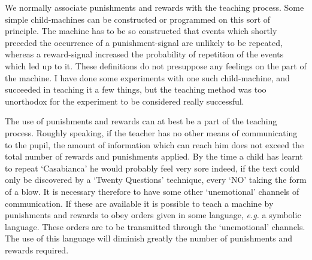     We normally associate punishments and rewards with the teaching process. Some simple child-machines can be constructed or programmed on this sort of principle. The machine has to be so constructed that events which shortly preceded the occurrence of a punishment-signal are unlikely to be repeated, whereas a reward-signal increased the probability of repetition of the events which led up to it. These definitions do not presuppose any feelings on the part of the machine. I have done some experiments with one such child-machine, and succeeded in teaching it a few things, but the teaching method was too unorthodox for the experiment to be considered really successful.

    The use of punishments and rewards can at best be a part of the teaching process. Roughly speaking, if the teacher has no other means of communicating to the pupil, the amount of information which can reach him does not exceed the total number of rewards and punishments applied. By the time a child has learnt to repeat ‘Casabianca' he would probably feel very sore indeed, if the text could only be discovered by a ‘Twenty Questions' technique, every ‘NO' taking the form of a blow. It is necessary therefore to have some other ‘unemotional' channels of communication. If these are available it is possible to teach a machine by punishments and rewards to obey orders given in some language, \textit{e.g.} a symbolic language. These orders are to be transmitted through the ‘unemotional' channels. The use of this language will diminish greatly the number of punishments and rewards required.

